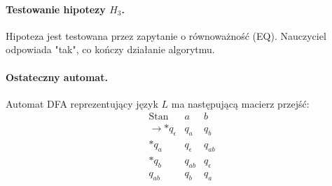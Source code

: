 \paragraph*{Testowanie hipotezy $H_3$.}
Hipoteza jest testowana przez zapytanie o równoważność (EQ). Nauczyciel odpowiada "tak", co kończy działanie algorytmu.

\paragraph*{Ostateczny automat.}
Automat DFA reprezentujący język \( L \) ma następującą macierz przejść:
\[
\begin{array}{c|c|c}
\text{Stan} & a & b \\
\hline
\rightarrow * q_\epsilon & q_a & q_b \\
* q_a & q_\epsilon & q_{ab} \\
* q_b & q_{ab} & q_\epsilon \\
q_{ab} & q_b & q_a \\
\end{array}
\]

